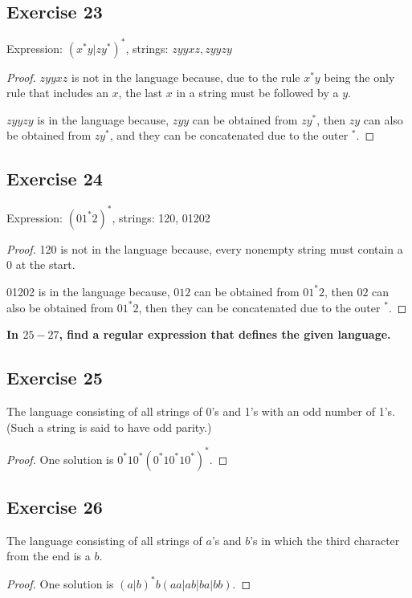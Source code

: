 \documentclass[14pt]{extarticle}
\newcommand{\cy}{\color{cyan}}
\begin{document}
\subsection{Exercise 23}
Expression: \((x^*y | zy^*)^*\), strings: \(zyyxz, zyyzy\)

\begin{proof}
    \(zyyxz\) is not in the language because, due to the rule \(x^*y\) being the only rule that includes an \(x\), the last
    \(x\) in a string must be followed by a \(y\).

    \(zyyzy\) is in the language because, \(zyy\) can be obtained from \(zy^*\), then \(zy\) can also be obtained from \(zy^*\),
    and they can be concatenated due to the outer \(^*\).
\end{proof}

\subsection{Exercise 24}
Expression: \((01^*2)^*\), strings: 120, 01202

\begin{proof}
    120 is not in the language because, every nonempty string must contain a 0 at the start.

    01202 is in the language because, \(012\) can be obtained from \(01^*2\), then \(02\) can also be obtained from \(01^*2\),
    then they can be concatenated due to the outer \(^*\).
\end{proof}

{\bf \cy In \(25-27\), find a regular expression that defines the given language.}

\subsection{Exercise 25}
The language consisting of all strings of 0’s and 1’s with an odd number of 1’s. (Such a string is said to have odd parity.)

\begin{proof}
    One solution is \(0^*10^*(0^*10^*10^*)^*\).
\end{proof}

\subsection{Exercise 26}
The language consisting of all strings of \(a\)’s and \(b\)’s in which the third character from the end is a \(b\).

\begin{proof}
    One solution is \((a|b)^*b(aa|ab|ba|bb)\).
\end{proof}
\end{document}
